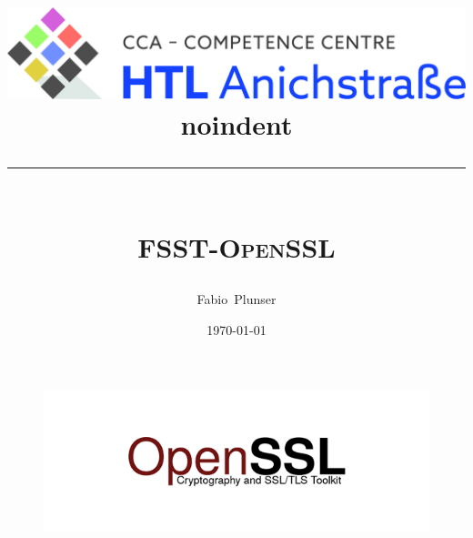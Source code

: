 \documentclass[12pt]{article}
\title{
  \vspace{-2cm}
  \centering
  \includegraphics[width=\linewidth]{htl-logo.jpg}\\
  noindent\rule{\linewidth}{1pt}\\
  \vspace{50px}
  \Huge\textbf{\textsc{FSST-OpenSSL}}
  \normalsize
}
\author{Fabio~Plunser}
\date{\today}
\begin{document}

\begin{titlepage}
  \maketitle
  \begin{figure}[!htb]
    \centering
    \includegraphics[scale=1]{OpenSSL.png}
    \label{UART-TitelBild}
  \end{figure}

  
\end{titlepage}


\pagebreak
\thispagestyle{empty}
\renewcommand\contentsname{Inhaltsverzeichnis}
\tableofcontents	
{}


\thispagestyle{empty}
\renewcommand\listfigurename{Abbildungsverzeichnis}
\listoffigures
\renewcommand\lstlistlistingname{Code}
\lstlistoflistings
\end{document}
